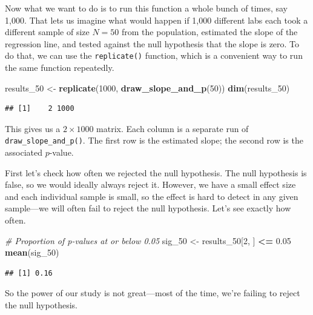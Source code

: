 \documentclass[
  12pt,
  oneside,openany]{book}
\newenvironment{Shaded}{\begin{snugshade}}{\end{snugshade}}
\newcommand{\CommentTok}[1]{\textcolor[rgb]{0.56,0.35,0.01}{\textit{#1}}}
\newcommand{\DecValTok}[1]{\textcolor[rgb]{0.00,0.00,0.81}{#1}}
\newcommand{\FloatTok}[1]{\textcolor[rgb]{0.00,0.00,0.81}{#1}}
\newcommand{\KeywordTok}[1]{\textcolor[rgb]{0.13,0.29,0.53}{\textbf{#1}}}
\newcommand{\NormalTok}[1]{#1}
\newcommand{\OperatorTok}[1]{\textcolor[rgb]{0.81,0.36,0.00}{\textbf{#1}}}
\newcommand{\StringTok}[1]{\textcolor[rgb]{0.31,0.60,0.02}{#1}}
\begin{document}
Now what we want to do is to run this function a whole bunch of times, say 1,000. That lets us imagine what would happen if 1,000 different labs each took a different sample of size \(N = 50\) from the population, estimated the slope of the regression line, and tested against the null hypothesis that the slope is zero. To do that, we can use the \texttt{replicate()} function, which is a convenient way to run the same function repeatedly.

\begin{Shaded}
\begin{Highlighting}[]
\NormalTok{results\_}\DecValTok{50}\NormalTok{ \textless{}{-}}\StringTok{ }\KeywordTok{replicate}\NormalTok{(}\DecValTok{1000}\NormalTok{, }\KeywordTok{draw\_slope\_and\_p}\NormalTok{(}\DecValTok{50}\NormalTok{))}
\KeywordTok{dim}\NormalTok{(results\_}\DecValTok{50}\NormalTok{)}
\end{Highlighting}
\end{Shaded}

\begin{verbatim}
## [1]    2 1000
\end{verbatim}

This gives us a \(2 \times 1000\) matrix. Each column is a separate run of \texttt{draw\_slope\_and\_p()}. The first row is the estimated slope; the second row is the associated \(p\)-value.

First let's check how often we rejected the null hypothesis. The null hypothesis is false, so we would ideally always reject it. However, we have a small effect size and each individual sample is small, so the effect is hard to detect in any given sample---we will often fail to reject the null hypothesis. Let's see exactly how often.

\begin{Shaded}
\begin{Highlighting}[]
\CommentTok{\# Proportion of p{-}values at or below 0.05}
\NormalTok{sig\_}\DecValTok{50}\NormalTok{ \textless{}{-}}\StringTok{ }\NormalTok{results\_}\DecValTok{50}\NormalTok{[}\DecValTok{2}\NormalTok{, ] }\OperatorTok{\textless{}=}\StringTok{ }\FloatTok{0.05}
\KeywordTok{mean}\NormalTok{(sig\_}\DecValTok{50}\NormalTok{)}
\end{Highlighting}
\end{Shaded}

\begin{verbatim}
## [1] 0.16
\end{verbatim}

So the power of our study is not great---most of the time, we're failing to reject the null hypothesis.
\end{document}
